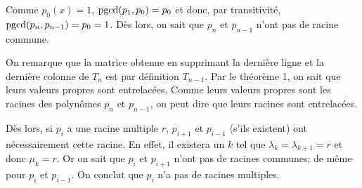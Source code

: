 Comme $p_0(x) = 1$, $\operatorname{pgcd}(p_1,p_0) = p_0$ et donc, par transitivité,
$\operatorname{pgcd}(p_n, p_{n-1}) = p_0 = 1$.
Dès lors, on sait que $p_n$ et $p_{n-1}$ n'ont pas de racine commune.


On remarque que la matrice obtenue en supprimant
la dernière ligne et la dernière colonne de $T_n$ est par définition $T_{n-1}$.
Par le théorème 1, on sait que leurs valeurs propres sont entrelacées.
Comme leurs valeurs propres sont les racines des polynômes $p_n$ et $p_{n-1}$, on peut dire que leurs racines sont entrelacées.

Dès lors, si $p_i$ a une racine multiple $r$, $p_{i+1}$ et $p_{i-1}$
(s'ils existent) ont nécessairement cette racine.
En effet, il existera un $k$ tel que
$\lambda_k = \lambda_{k+1} = r$ et donc $\mu_{k} = r$.
Or on sait que $p_i$ et $p_{i+1}$ n'ont pas de racines communes;
de même pour $p_i$ et $p_{i-1}$.
On conclut que $p_i$ n'a pas de racines multiples.


